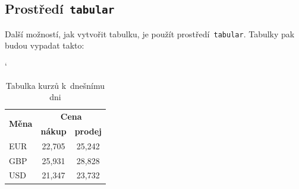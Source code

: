 \documentclass[a4paper, 11pt]{article}
\begin{document}
\subsection{Prostředí\texttt{ tabular}}

Další možností, jak vytvořit tabulku, je použít prostředí\texttt{ tabular}.
Tabulky pak budou vypadat takto\footnotemark[1]:

\bigskip
\begin{table}[h!]
	\catcode`
	\centering
	\begin{tabular}{|l|c|c|}
		\hline
		\multirow{2}{*}{\textbf{Měna}} & \multicolumn{2}{c|}{\textbf{Cena}}                   \\ \cline{2-3}
		                               & \textbf{nákup}                     & \textbf{prodej} \\
		\hline
		EUR                            & 22,705                             & 25,242          \\
		GBP                            & 25,931                             & 28,828          \\
		USD                            & 21,347                             & 23,732          \\
		\hline
	\end{tabular}

	\caption{Tabulka kurz\r{u} k~dnešnímu dni}
	\label{tab:kurz}

\end{table}
\end{document}
